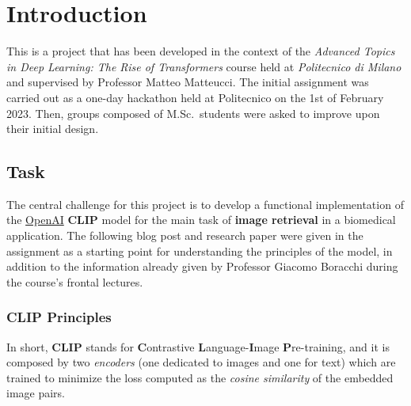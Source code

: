 \documentclass[10pt,twocolumn,letterpaper]{article}
\begin{document}
\section{Introduction}
This is a project that has been developed in the context of the \textit{Advanced Topics in Deep Learning: The Rise of Transformers} course held at \textit{Politecnico di Milano} and supervised by Professor Matteo Matteucci.
The initial assignment was carried out as a one-day hackathon held at Politecnico on the 1st of February 2023. Then, groups composed of M.Sc.\ students were asked to improve upon their initial design.




\subsection{Task}
The central challenge for this project is to develop a functional implementation of the \href{https://openai.com/}{OpenAI} \textbf{CLIP} model for the main task of \textbf{image retrieval} in a biomedical application.
The following blog post\cite{clip_blog} and research paper\cite{clip_paper} were given in the assignment as a starting point for understanding the principles of the model, in addition to the information already given by Professor Giacomo Boracchi during the course's frontal lectures.

\subsubsection*{CLIP Principles}
In short, \textbf{CLIP} stands for \textbf{C}ontrastive \textbf{L}anguage-\textbf{I}mage \textbf{P}re-training, and it is composed by two \textit{encoders} (one dedicated to images and one for text) which are trained to minimize the loss computed as the \textit{cosine similarity} of the embedded image pairs.
\end{document}
